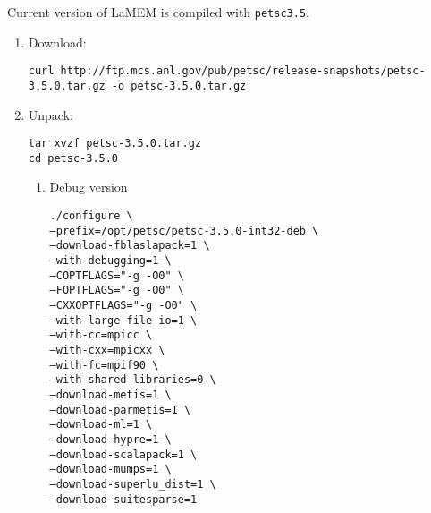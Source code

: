 \documentclass[a4paper,11pt]{article}
\begin{document}
Current version of LaMEM is compiled with \texttt{petsc3.5}.\\

\begin{enumerate}
\item Download:

\indent \texttt{\scriptsize curl http://ftp.mcs.anl.gov/pub/petsc/release-snapshots/petsc-3.5.0.tar.gz -o petsc-3.5.0.tar.gz}

\item Unpack:

\indent \texttt{tar xvzf petsc-3.5.0.tar.gz}\\
\indent \texttt{cd petsc-3.5.0}

\begin{enumerate}
\item Debug version

\indent \texttt{./configure \textbackslash}\\
\indent \texttt{--prefix=/opt/petsc/petsc-3.5.0-int32-deb \textbackslash}\\
\indent \texttt{--download-fblaslapack=1 \textbackslash}\\
\indent \texttt{--with-debugging=1 \textbackslash}\\
\indent \texttt{--COPTFLAGS="-g -O0" \textbackslash}\\
\indent \texttt{--FOPTFLAGS="-g -O0" \textbackslash}\\
\indent \texttt{--CXXOPTFLAGS="-g -O0" \textbackslash}\\
\indent \texttt{--with-large-file-io=1 \textbackslash}\\
\indent \texttt{--with-cc=mpicc \textbackslash}\\
\indent \texttt{--with-cxx=mpicxx \textbackslash}\\
\indent \texttt{--with-fc=mpif90 \textbackslash}\\
\indent \texttt{--with-shared-libraries=0 \textbackslash}\\
\indent \texttt{--download-metis=1 \textbackslash}\\
\indent \texttt{--download-parmetis=1 \textbackslash}\\
\indent \texttt{--download-ml=1 \textbackslash}\\
\indent \texttt{--download-hypre=1 \textbackslash}\\
\indent \texttt{--download-scalapack=1 \textbackslash}\\
\indent \texttt{--download-mumps=1 \textbackslash}\\
\indent \texttt{--download-superlu\_dist=1 \textbackslash}\\
\indent \texttt{--download-suitesparse=1 }\\



\end{enumerate}
\end{enumerate}
\end{document}
